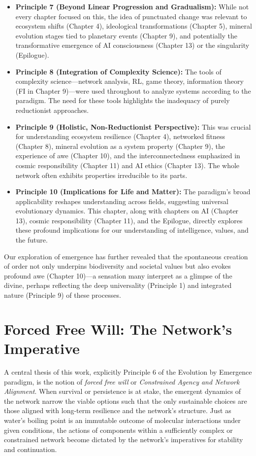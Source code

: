 \begin{itemize}
    \item \textbf{Principle 7 (Beyond Linear Progression and Gradualism):} While not every chapter focused on this, the idea of punctuated change was relevant to ecosystem shifts (Chapter 4), ideological transformations (Chapter 5), mineral evolution stages tied to planetary events (Chapter 9), and potentially the transformative emergence of AI consciousness (Chapter 13) or the singularity (Epilogue).

    \item \textbf{Principle 8 (Integration of Complexity Science):} The tools of complexity science—network analysis, RL, game theory, information theory (FI in Chapter 9)—were used throughout to analyze systems according to the paradigm. The need for these tools highlights the inadequacy of purely reductionist approaches.

    \item \textbf{Principle 9 (Holistic, Non-Reductionist Perspective):} This was crucial for understanding ecosystem resilience (Chapter 4), networked fitness (Chapter 8), mineral evolution as a system property (Chapter 9), the experience of awe (Chapter 10), and the interconnectedness emphasized in cosmic responsibility (Chapter 11) and AI ethics (Chapter 13). The whole network often exhibits properties irreducible to its parts.

    \item \textbf{Principle 10 (Implications for Life and Matter):} The paradigm's broad applicability reshapes understanding across fields, suggesting universal evolutionary dynamics. This chapter, along with chapters on AI (Chapter 13), cosmic responsibility (Chapter 11), and the Epilogue, directly explores these profound implications for our understanding of intelligence, values, and the future.
\end{itemize}
Our exploration of emergence has further revealed that the spontaneous creation of order not only underpins biodiversity and societal values but also evokes profound awe (Chapter 10)—a sensation many interpret as a glimpse of the divine, perhaps reflecting the deep universality (Principle 1) and integrated nature (Principle 9) of these processes. %

\section{Forced Free Will: The Network's Imperative}
A central thesis of this work, explicitly Principle 6 of the Evolution by Emergence paradigm, is the notion of \emph{forced free will} or \emph{Constrained Agency and Network Alignment}. When survival or persistence is at stake, the emergent dynamics of the network narrow the viable options such that the only sustainable choices are those aligned with long-term resilience and the network's structure. Just as water’s boiling point is an immutable outcome of molecular interactions under given conditions, the actions of components within a sufficiently complex or constrained network become dictated by the network’s imperatives for stability and continuation.

